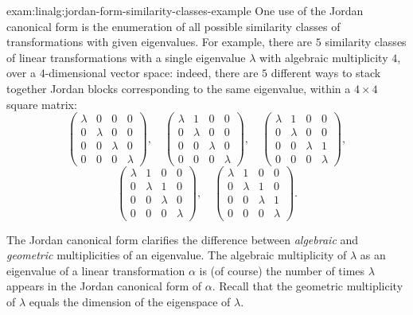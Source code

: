 \begin{exam}{}{exam:linalg:jordan-form-similarity-classes-example}
  One use of the Jordan canonical form is the enumeration of all
  possible similarity classes of transformations with given
  eigenvalues. For example, there are $5$ similarity classes of linear
  transformations with a single eigenvalue $\lambda$ with algebraic
  multiplicity $4$, over a $4$-dimensional vector space: indeed, there
  are $5$ different ways to stack together Jordan blocks corresponding
  to the same eigenvalue, within a $4 \times 4$ square matrix:
  \[
    \begin{pmatrix}
      \lambda & 0 & 0 & 0 \\
      0 & \lambda & 0 & 0 \\
      0 & 0 & \lambda & 0 \\
      0 & 0 & 0 & \lambda
    \end{pmatrix}, \quad
    \begin{pmatrix}
      \lambda & 1 & 0 & 0 \\
      0 & \lambda & 0 & 0 \\
      0 & 0 & \lambda & 0 \\
      0 & 0 & 0 & \lambda
    \end{pmatrix}, \quad
    \begin{pmatrix}
      \lambda & 1 & 0 & 0 \\
      0 & \lambda & 0 & 0 \\
      0 & 0 & \lambda & 1 \\
      0 & 0 & 0 & \lambda
    \end{pmatrix},
  \]
  \[
    \begin{pmatrix}
      \lambda & 1 & 0 & 0 \\
      0 & \lambda & 1 & 0 \\
      0 & 0 & \lambda & 0 \\
      0 & 0 & 0 & \lambda
    \end{pmatrix}, \quad
    \begin{pmatrix}
      \lambda & 1 & 0 & 0 \\
      0 & \lambda & 1 & 0 \\
      0 & 0 & \lambda & 1 \\
      0 & 0 & 0 & \lambda
    \end{pmatrix}.
  \]
\end{exam}

The Jordan canonical form clarifies the difference between
\emph{algebraic} and \emph{geometric} multiplicities of an eigenvalue.
The algebraic multiplicity of $\lambda$ as an eigenvalue of a linear
transformation $\alpha$ is (of course) the number of times $\lambda$
appears in the Jordan canonical form of $\alpha$. Recall that the
geometric multiplicity of $\lambda$ equals the dimension of the
eigenspace of $\lambda$.

